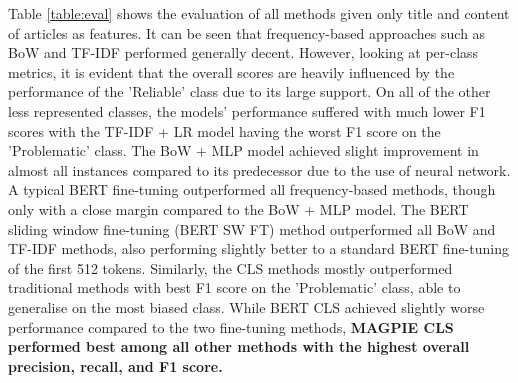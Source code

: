 Table \ref{table:eval} shows the evaluation of all methods given only title and content of articles as features. It can be seen that frequency-based approaches such as BoW and TF-IDF performed generally decent. However, looking at per-class metrics, it is evident that the overall scores are heavily influenced by the performance of the 'Reliable' class due to its large support. On all of the other less represented classes, the models' performance suffered with much lower F1 scores with the TF-IDF + LR model having the worst F1 score on the 'Problematic' class. The BoW + MLP model achieved slight improvement in almost all instances compared to its predecessor due to the use of neural network. A typical BERT fine-tuning outperformed all frequency-based methods, though only with a close margin compared to the BoW + MLP model. The BERT sliding window fine-tuning (BERT SW FT) method outperformed all BoW and TF-IDF methods, also performing slightly better to a standard BERT fine-tuning of the first 512 tokens. Similarly, the CLS methods mostly outperformed traditional methods with best F1 score on the 'Problematic' class, able to generalise on the most biased class. While BERT CLS achieved slightly worse performance compared to the two fine-tuning methods, \textbf{MAGPIE CLS performed best among all other methods with the highest overall precision, recall, and F1 score.}

